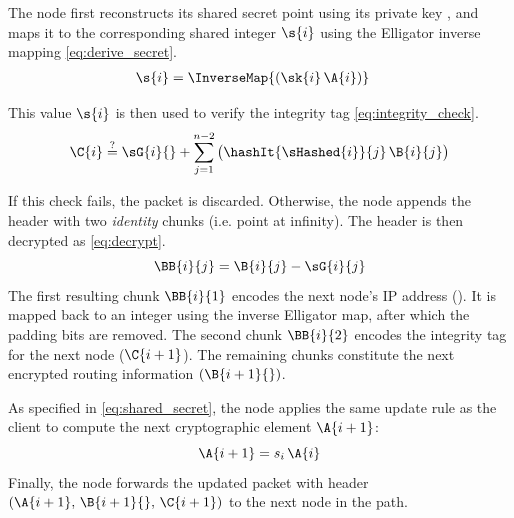 The node first reconstructs its shared secret point using its private key , and maps it to the corresponding shared integer $\s{i}$ using the Elligator inverse mapping \eqref{eq:derive_secret}.
\begin{equation}
\begin{aligned}
    \s{i} &= \InverseMap{(\sk{i} \, \A{i})}
\end{aligned}
\label{eq:derive_secret}
\end{equation}

\noindent
This value $\s{i}$ is then used to verify the integrity tag \eqref{eq:integrity_check}.
\begin{equation}
\C{i} \overset{\text{?}}{=} \sG{i}{} + \sum_{j=1}^{n-2} \big( \hashIt{\sHashed{i}}{j} \, \B{i}{j} \big)
\label{eq:integrity_check}
\end{equation}

If this check fails, the packet is discarded.
Otherwise, the node appends the header with two \textit{identity} chunks (i.e. point at infinity).
The header is then decrypted as \eqref{eq:decrypt}.
\begin{equation}
\BB{i}{j} = \B{i}{j} - \sG{i}{j}
\label{eq:decrypt}
\end{equation}
The first resulting chunk $\BB{i}{1}$ encodes the next node's IP address ().  
It is mapped back to an integer using the inverse Elligator map, after which the padding bits are removed.
The second chunk $\BB{i}{2}$ encodes the integrity tag for the next node ($\C{i+1}$).  
The remaining chunks constitute the next encrypted routing information $(\B{i+1}{})$.

As specified in \eqref{eq:shared_secret}, the node applies the same update rule as the client to compute the next cryptographic element $\A{i+1}$:
\begin{equation}
\A{i+1} = s_i \, \A{i}
\label{eq:update_alpha}
\end{equation}
Finally, the node forwards the updated packet with header $(\A{i+1},\, \B{i+1}{},\, \C{i+1})$ to the next node in the path.

